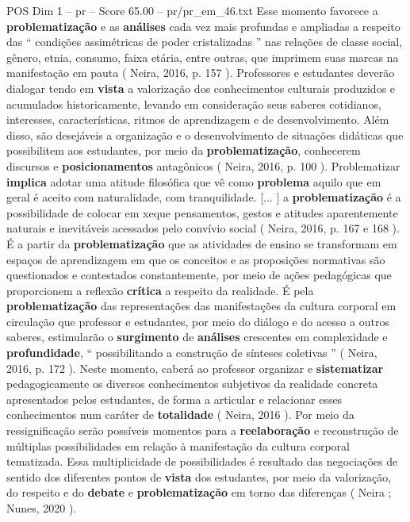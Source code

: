 \begin{textsample}{POS Dim 1 – pr – Score 65.00 – pr/pr\_em\_46.txt}
Esse momento favorece a \textbf{problematização} e as \textbf{análises} cada vez mais profundas e ampliadas a respeito das “ condições assimétricas de poder cristalizadas ” nas relações de classe social, gênero, etnia, consumo, faixa etária, entre outras, que imprimem suas marcas na manifestação em pauta ( Neira, 2016, p. 157 ).
Professores e estudantes deverão dialogar tendo em \textbf{vista} a valorização dos conhecimentos culturais produzidos e acumulados historicamente, levando em consideração seus saberes cotidianos, interesses, características, ritmos de aprendizagem e de desenvolvimento.
Além disso, são desejáveis a organização e o desenvolvimento de situações didáticas que possibilitem aos estudantes, por meio da \textbf{problematização}, conhecerem discursos e \textbf{posicionamentos} antagônicos ( Neira, 2016, p. 100 ).
Problematizar \textbf{implica} adotar uma atitude filosófica que vê como \textbf{problema} aquilo que em geral é aceito com naturalidade, com tranquilidade. [... ] a \textbf{problematização} é a possibilidade de colocar em xeque pensamentos, gestos e atitudes aparentemente naturais e inevitáveis acessados pelo convívio social ( Neira, 2016, p. 167 e 168 ).
É a partir da \textbf{problematização} que as atividades de ensino se transformam em espaços de aprendizagem em que os conceitos e as proposições normativas são questionados e contestados constantemente, por meio de ações pedagógicas que proporcionem a reflexão \textbf{crítica} a respeito da realidade.
É pela \textbf{problematização} das representações das manifestações da cultura corporal em circulação que professor e estudantes, por meio do diálogo e do acesso a outros saberes, estimularão o \textbf{surgimento} de \textbf{análises} crescentes em complexidade e \textbf{profundidade}, “ possibilitando a construção de sínteses coletivas ” ( Neira, 2016, p. 172 ).
Neste momento, caberá ao professor organizar e \textbf{sistematizar} pedagogicamente os diversos conhecimentos subjetivos da realidade concreta apresentados pelos estudantes, de forma a articular e relacionar esses conhecimentos num caráter de \textbf{totalidade} ( Neira, 2016 ).
Por meio da ressignificação serão possíveis momentos para a \textbf{reelaboração} e reconstrução de múltiplas possibilidades em relação à manifestação da cultura corporal tematizada.
Essa multiplicidade de possibilidades é resultado das negociações de sentido dos diferentes pontos de \textbf{vista} dos estudantes, por meio da valorização, do respeito e do \textbf{debate} e \textbf{problematização} em torno das diferenças ( Neira ; Nunes, 2020 ).

\end{textsample}
